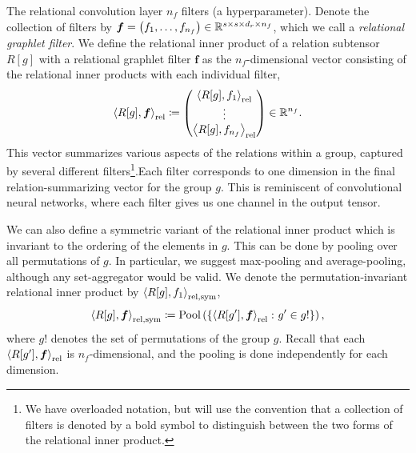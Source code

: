 The relational convolution layer $n_f$ filters (a hyperparameter). Denote the collection of filters by $\boldsymbol{f} = \left(f_1, \ldots, f_{n_f}\right) \in \mathbb{R}^{s \times s \times d_r \times n_f}$, which we call a \textit{relational graphlet filter}. We define the relational inner product of a relation subtensor $R[g]$ with a relational graphlet filter $\bm{f}$ as the $n_f$-dimensional vector consisting of the relational inner products with each individual filter,
\begin{equation}
    \label{eq:relational_inner_prod}
    \left\langle R[g], \bm{f} \right\rangle_\mathrm{rel} \coloneq \begin{pmatrix} \left\langle R[g], f_1 \right\rangle_\mathrm{rel} \\ \vdots 
 \\ \left\langle R[g], f_{n_f} \right\rangle_\mathrm{rel} \end{pmatrix} \in \mathbb{R}^{n_f}.
\end{equation}
This vector summarizes various aspects of the relations within a group, captured by several different filters\footnote{We have overloaded notation, but will use the convention that a collection of filters is denoted by a bold symbol to distinguish between the two forms of the relational inner product.}.Each filter corresponds to one dimension in the final relation-summarizing vector for the group $g$. This is reminiscent of convolutional neural networks, where each filter gives us one channel in the output tensor.

We can also define a symmetric variant of the relational inner product which is invariant to the ordering of the elements in $g$. This can be done by pooling over all permutations of $g$. In particular, we suggest max-pooling and average-pooling, although any set-aggregator would be valid. We denote the permutation-invariant relational inner product by $\left \langle R[g], f_1 \right\rangle_{\mathrm{rel}, \mathrm{sym}}$,
\begin{equation}\label{eq:symmetric_relational_inner_prod}
    \left \langle R[g], \bm{f} \right\rangle_{\mathrm{rel}, \mathrm{sym}} \coloneq \mathrm{Pool}\left(\left\{\left\langle R[g'], \bm{f} \right\rangle_\mathrm{rel} \colon g' \in g!\right\}\right),
\end{equation}
\noindent where $g!$ denotes the set of permutations of the group $g$. Recall that each $\left \langle R[g'], \bm{f} \right\rangle_{\mathrm{rel}}$ is $n_f$-dimensional, and the pooling is done independently for each dimension.

